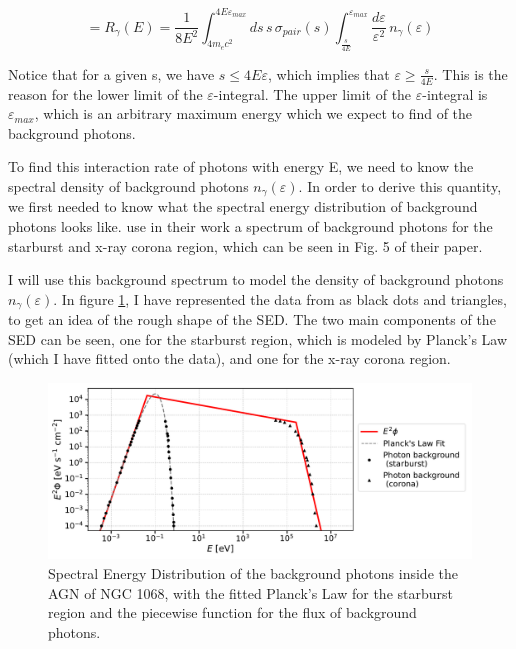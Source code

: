 \begin{equation}
    = R_{\gamma}(E) = \frac{1}{8E^2}\int_{4m_ec^2}^{4E\varepsilon_{max}}ds\,s\,\sigma_{pair}(s)\int_{\frac{s}{4E}}^{\varepsilon_{max}}\frac{d\varepsilon}{\varepsilon^2}\,n_{\gamma}(\varepsilon)
    \label{eq:interaction_rate_third_one}
\end{equation}

Notice that for a given s, we have $s \leq 4E\varepsilon$, which implies that $\varepsilon \geq \frac{s}{4E}$. This is the reason for the lower limit of the $\varepsilon$-integral. The upper limit of the $\varepsilon$-integral is $\varepsilon_{max}$, which is an arbitrary maximum energy which we expect to find of the background photons.

To find this interaction rate of photons with energy E, we need to know the spectral density of background photons $n_{\gamma}(\varepsilon)$. In order to derive this quantity, we first needed to know what the spectral energy distribution of background photons looks like. \citet{Eichmann_2022} use in their work a spectrum of background photons for the starburst and x-ray corona region, which can be seen in Fig. 5 of their paper.

I will use this background spectrum to model the density of background photons $n_{\gamma}(\varepsilon)$. In figure \ref{fig:background_spectral_density}, I have represented the data from \citet{Eichmann_2022} as black dots and triangles, to get an idea of the rough shape of the SED. The two main components of the SED can be seen, one for the starburst region, which is modeled by Planck's Law (which I have fitted onto the data), and one for the x-ray corona region.

\begin{figure}[H]
    \centering
    \includegraphics[width=\textwidth]{Figures/Background_SED_AGN.pdf}
    \caption{Spectral Energy Distribution of the background photons inside the AGN of NGC 1068, with the fitted Planck's Law for the starburst region and the piecewise function for the flux of background photons.} 
    \label{fig:background_spectral_density}
\end{figure}

